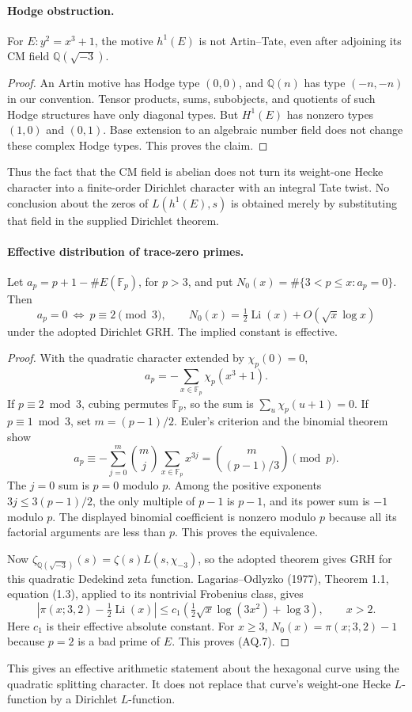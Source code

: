 \paragraph{Hodge obstruction.}
For $E:y^2=x^3+1$, the motive $h^1(E)$ is not Artin--Tate,
even after adjoining its CM field $\mathbb Q(\sqrt{-3})$.
\begin{proof}
An Artin motive has Hodge type $(0,0)$, and $\mathbb Q(n)$
has type $(-n,-n)$ in our convention.
Tensor products, sums, subobjects, and quotients of such
Hodge structures have only diagonal types. But
$H^1(E)$ has nonzero types $(1,0)$ and $(0,1)$.
Base extension to an algebraic number field does not
change these complex Hodge types. This proves the claim.
\end{proof}
Thus the fact that the CM field is abelian does not turn
its weight-one Hecke character into a finite-order
Dirichlet character with an integral Tate twist.
No conclusion about the zeros of $L(h^1(E),s)$ is obtained
merely by substituting that field in the supplied
Dirichlet theorem.

\paragraph{Effective distribution of trace-zero primes.}
Let $a_p=p+1-\#E(\mathbb F_p)$, for $p>3$, and put
$N_0(x)=\#\{3<p\leq x:a_p=0\}$. Then
\[
 a_p=0\ \Longleftrightarrow\ p\equiv2\pmod3,\qquad
 N_0(x)=\tfrac12\operatorname{Li}(x)+O(\sqrt x\log x)            \tag{AQ.7}
\]
under the adopted Dirichlet GRH. The implied constant is
effective.
\begin{proof}
With the quadratic character extended by $\chi_p(0)=0$,
\[
 a_p=-\sum_{x\in\mathbb F_p}\chi_p(x^3+1).
\]
If $p\equiv2\bmod3$, cubing permutes $\mathbb F_p$,
so the sum is $\sum_u\chi_p(u+1)=0$.
If $p\equiv1\bmod3$, set $m=(p-1)/2$.
Euler's criterion and the binomial theorem show
\[
 a_p\equiv-\sum_{j=0}^m {m\choose j}
                 \sum_{x\in\mathbb F_p}x^{3j}
       ={m\choose (p-1)/3}\pmod p.
\]
The $j=0$ sum is $p=0$ modulo $p$.
Among the positive exponents $3j\leq3(p-1)/2$, the
only multiple of $p-1$ is $p-1$, and its power sum is
$-1$ modulo $p$. The displayed binomial coefficient
is nonzero modulo $p$ because all its factorial arguments
are less than $p$. This proves the equivalence.

Now $\zeta_{\mathbb Q(\sqrt{-3})}(s)=
\zeta(s)L(s,\chi_{-3})$, so the adopted theorem gives
GRH for this quadratic Dedekind zeta function.
Lagarias--Odlyzko (1977), Theorem 1.1, equation (1.3),
applied to its nontrivial Frobenius class, gives
\[
 \left|\pi(x;3,2)-\tfrac12\operatorname{Li}(x)\right|
 \leq c_1\left(\tfrac12\sqrt x\log(3x^2)+\log3\right),
 \qquad x>2.
\]
Here $c_1$ is their effective absolute constant.
For $x\geq3$, $N_0(x)=\pi(x;3,2)-1$ because $p=2$
is a bad prime of $E$. This proves (AQ.7).
\end{proof}
This gives an effective arithmetic statement about the
hexagonal curve using the quadratic splitting character.
It does not replace that curve's weight-one Hecke
$L$-function by a Dirichlet $L$-function.

